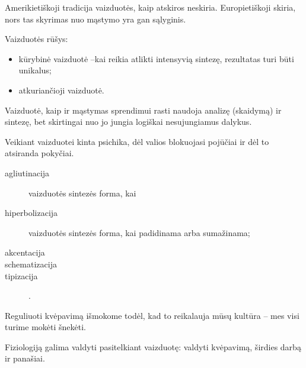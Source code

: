 Amerikietiškoji tradicija vaizduotės, kaip atskiros neskiria. Europietiškoji
skiria, nors tas skyrimas nuo mąstymo yra gan sąlyginis.

Vaizduotės rūšys:

\begin{itemize}
  \item kūrybinė vaizduotė –kai reikia atlikti intensyvią sintezę, 
    rezultatas turi būti unikalus;
  \item atkuriančioji vaizduotė. %
\end{itemize}

Vaizduotė, kaip ir mąstymas sprendimui rasti naudoja analizę (skaidymą) ir
sintezę, bet skirtingai nuo jo jungia logiškai nesujungiamus dalykus.

Veikiant vaizduotei kinta psichika, dėl valios blokuojasi pojūčiai ir dėl
to atsiranda pokyčiai. %

\begin{description}
  \item[agliutinacija] vaizduotės sintezės forma, kai
  \item[hiperbolizacija] vaizduotės sintezės forma, kai padidinama arba
    sumažinama;
  \item[akcentacija] 
  \item[schematizacija] 
  \item[tipizacija] .
\end{description}

Reguliuoti kvėpavimą išmokome todėl, kad to reikalauja mūsų kultūra – mes
visi turime mokėti šnekėti.

Fiziologiją galima valdyti pasitelkiant vaizduotę: valdyti kvėpavimą, 
širdies darbą ir panašiai.
